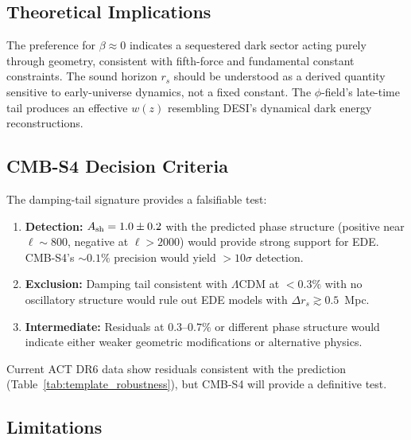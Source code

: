 \documentclass[a4paper,11pt]{article}
\begin{document}
\subsection*{Theoretical Implications}

The preference for $\beta \approx 0$ indicates a sequestered dark sector acting purely through geometry, consistent with fifth-force and fundamental constant constraints. The sound horizon $r_s$ should be understood as a derived quantity sensitive to early-universe dynamics, not a fixed constant. The $\phi$-field's late-time tail produces an effective $w(z)$ resembling DESI's dynamical dark energy reconstructions.

\subsection*{CMB-S4 Decision Criteria}
\label{sec:s4_decision}

The damping-tail signature provides a falsifiable test:
\begin{enumerate}
    \item \textbf{Detection:} $A_{\rm sh} = 1.0 \pm 0.2$ with the predicted phase structure (positive near $\ell \sim 800$, negative at $\ell > 2000$) would provide strong support for EDE. CMB-S4's $\sim 0.1\%$ precision would yield $>10\sigma$ detection.
    
    \item \textbf{Exclusion:} Damping tail consistent with $\Lambda$CDM at $< 0.3\%$ with no oscillatory structure would rule out EDE models with $\Delta r_s \gtrsim 0.5$~Mpc.
    
    \item \textbf{Intermediate:} Residuals at $0.3$--$0.7\%$ or different phase structure would indicate either weaker geometric modifications or alternative physics.
\end{enumerate}

Current ACT DR6 data show residuals consistent with the prediction (Table~\ref{tab:template_robustness}), but CMB-S4 will provide a definitive test.

\subsection*{Limitations}
\label{sec:limitations}
\end{document}

